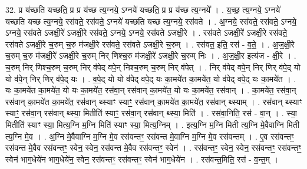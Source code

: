 \documentclass[17pt]{extarticle}
\begin{document}
32. प्र य॑च्छति यच्छति॒ प्र प्र य॑च्छ त्य॒ग्नये॒ ऽग्नये॑ यच्छति॒ प्र प्र य॑च्छ त्य॒ग्नये᳚ । . य॒च्छ॒ त्य॒ग्नये॒ ऽग्नये॑ यच्छति यच्छ त्य॒ग्नये॒ रस॑वते॒ रस॑वते॒ ऽग्नये॑ यच्छति यच्छ त्य॒ग्नये॒ रस॑वते । . अ॒ग्नये॒ रस॑वते॒ रस॑वते॒ ऽग्नये॒ ऽग्नये॒ रस॑वते ऽजक्षी॒रे॑ ऽजक्षी॒रे रस॑वते॒ ऽग्नये॒ ऽग्नये॒ रस॑वते ऽजक्षी॒रे । . रस॑वते ऽजक्षी॒रे॑ ऽजक्षी॒रे रस॑वते॒ रस॑वते ऽजक्षी॒रे च॒रुम् च॒रु म॑जक्षी॒रे रस॑वते॒ रस॑वते ऽजक्षी॒रे च॒रुम् । . रस॑वत॒ इति॒ रस॑ - व॒ते॒ । . अ॒ज॒क्षी॒रे च॒रुम् च॒रु म॑जक्षी॒रे॑ ऽजक्षी॒रे च॒रुम् निर् णिश्च॒रु म॑जक्षी॒रे॑ ऽजक्षी॒रे च॒रुम् निः । . अ॒ज॒क्षी॒र इत्य॑ज - क्षी॒रे । . च॒रुम् निर् णिश्च॒रुम् च॒रुम् निर् व॑पेद् वपे॒न् निश्च॒रुम् च॒रुम् निर् व॑पेत् । . निर् व॑पेद् वपे॒न् निर् णिर् व॑पे॒द् यो यो व॑पे॒न् निर् णिर् व॑पे॒द् यः । . व॒पे॒द् यो यो व॑पेद् वपे॒द् यः का॒मये॑त का॒मये॑त॒ यो व॑पेद् वपे॒द् यः का॒मये॑त । . यः का॒मये॑त का॒मये॑त॒ यो यः का॒मये॑त॒ रस॑वा॒न् रस॑वान् का॒मये॑त॒ यो यः का॒मये॑त॒ रस॑वान् । . का॒मये॑त॒ रस॑वा॒न् रस॑वान् का॒मये॑त का॒मये॑त॒ रस॑वान् थ्स्याꣳ स्याꣳ॒॒ रस॑वान् का॒मये॑त का॒मये॑त॒ रस॑वान् थ्स्याम् । . रस॑वान् थ्स्याꣳ स्याꣳ॒॒ रस॑वा॒न् रस॑वान् थ्स्या॒ मितीति॑ स्याꣳ॒॒ रस॑वा॒न् रस॑वान् थ्स्या॒ मिति॑ । . रस॑वा॒निति॒ रस॑ - वा॒न् । . स्या॒ मितीति॑ स्याꣳ स्या॒ मित्य॒ग्नि म॒ग्नि मिति॑ स्याꣳ स्या॒ मित्य॒ग्निम् । . इत्य॒ग्नि म॒ग्नि मिती त्य॒ग्नि मे॒वैवाग्नि मिती त्य॒ग्नि मे॒व । . अ॒ग्नि मे॒वैवाग्नि म॒ग्नि मे॒व रस॑वन्तꣳ॒॒ रस॑वन्त मे॒वाग्नि म॒ग्नि मे॒व रस॑वन्तम् । . ए॒व रस॑वन्तꣳ॒॒ रस॑वन्त मे॒वैव रस॑वन्तꣳ॒॒ स्वेन॒ स्वेन॒ रस॑वन्त मे॒वैव रस॑वन्तꣳ॒॒ स्वेन॑ । . रस॑वन्तꣳ॒॒ स्वेन॒ स्वेन॒ रस॑वन्तꣳ॒॒ रस॑वन्तꣳ॒॒ स्वेन॑ भाग॒धेये॑न भाग॒धेये॑न॒ स्वेन॒ रस॑वन्तꣳ॒॒ रस॑वन्तꣳ॒॒ स्वेन॑ भाग॒धेये॑न । . रस॑वन्त॒मिति॒ रस॑ - व॒न्त॒म् । \newline
\end{document}
